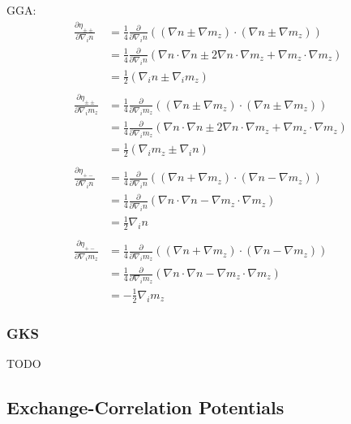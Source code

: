 \documentclass[11pt]{article}
\begin{document}
GGA:
\begin{align}
  \frac{\partial \eta_{\pm\pm}}{\partial \nabla_i n} &= 
    \frac{1}{4} \frac{\partial}{\partial \nabla_i n}\left((\nabla n \pm \nabla m_z)\cdot(\nabla n \pm \nabla m_z)\right) \nonumber \\
  &= \frac{1}{4} \frac{\partial}{\partial \nabla_i n}\left(\nabla n\cdot \nabla n \pm 2 \nabla n\cdot \nabla m_z + \nabla m_z\cdot \nabla m_z\right) \nonumber \\
  &= \frac{1}{2}(\nabla_i n \pm \nabla_i m_z)\\
  \nonumber \\
  \frac{\partial \eta_{\pm\pm}}{\partial \nabla_i m_z} &= 
    \frac{1}{4} \frac{\partial}{\partial \nabla_i m_z}\left((\nabla n \pm \nabla m_z)\cdot(\nabla n \pm \nabla m_z)\right) \nonumber \\
  &= \frac{1}{4} \frac{\partial}{\partial \nabla_i m_z}\left(\nabla n\cdot \nabla n \pm 2 \nabla n\cdot \nabla m_z + \nabla m_z\cdot \nabla m_z\right) \nonumber \\
  &= \frac{1}{2}(\nabla_i m_z \pm \nabla_i n)\\
  \nonumber \\
  \frac{\partial \eta_{+-}}{\partial \nabla_i n} &= 
    \frac{1}{4} \frac{\partial}{\partial \nabla_i n}\left((\nabla n + \nabla m_z)\cdot(\nabla n - \nabla m_z)\right) \nonumber \\
  &= \frac{1}{4} \frac{\partial}{\partial \nabla_i n}\left(\nabla n\cdot \nabla n - \nabla m_z\cdot \nabla m_z\right) \nonumber \\
  &= \frac{1}{2} \nabla_i n \\
  \nonumber \\
  \frac{\partial \eta_{+-}}{\partial \nabla_i m_z} &= 
    \frac{1}{4} \frac{\partial}{\partial \nabla_i m_z}\left((\nabla n + \nabla m_z)\cdot(\nabla n - \nabla m_z)\right) \nonumber \\
  &= \frac{1}{4} \frac{\partial}{\partial \nabla_i m_z}\left(\nabla n\cdot \nabla n - \nabla m_z\cdot \nabla m_z\right) \nonumber \\
  &= -\frac{1}{2} \nabla_i m_z
\end{align}

\subsubsection{GKS}
TODO



\subsection{Exchange-Correlation Potentials}
\end{document}
